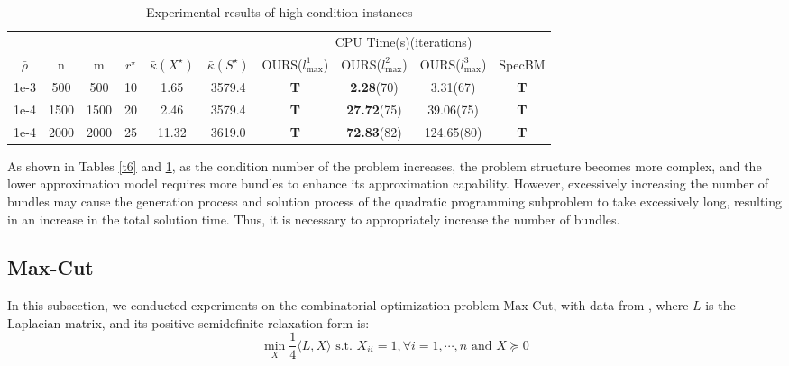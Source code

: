 \documentclass{jcmlatex}
\begin{document}
\begin{table}
    \centering
    \caption{Experimental results of high condition instances}
    \label{t7}
    \setlength\tabcolsep{0.9pt}
    \begin{tabular*}{\textwidth}{@{\extracolsep\fill}cccccccccc}
\toprule  
~&~&~&~&~&~& \multicolumn{4}{c}{CPU Time(s)(iterations)} \\
\cmidrule{7-10}
\(\bar{\rho}\) & n &m& \(r^{\star}\) &\(\bar{\kappa}(X^{\star})\)&\(\bar{\kappa}(S^{\star})\)& OURS(\(l_{\max}^{1}\)) & OURS(\(l_{\max}^{2}\))& OURS(\(l_{\max}^{3}\)) & SpecBM\\ 
\midrule 
    1e-3 & 500&500 &10&1.65 &3579.4 &\textbf{T} &\textbf{2.28}(70)&3.31(67) &\textbf{T} \\
    1e-4 & 1500&1500 &20&2.46 &3579.4 &\textbf{T} &\textbf{27.72}(75)&39.06(75) &\textbf{T} \\
    1e-4 & 2000&2000 &25&11.32 &3619.0 &\textbf{T} &\textbf{72.83}(82)&124.65(80) &\textbf{T} \\
\hline
\end{tabular*}
\end{table}

As shown in Tables \ref{t6} and \ref{t7}, as the condition number of the problem increases, the problem structure becomes more complex, and the lower approximation model requires more bundles to enhance its approximation capability. However, excessively increasing the number of bundles may cause the generation process and solution process of the quadratic programming subproblem to take excessively long, resulting in an increase in the total solution time. Thus, it is necessary to appropriately increase the number of bundles.
\subsection{Max-Cut}
In this subsection, we conducted experiments on the combinatorial optimization problem Max-Cut, with data from \cite{davis2011university}, where \(L\) is the Laplacian matrix, and its positive semidefinite relaxation form is:
\begin{equation*}
\underset{X}{\min} \frac{1}{4}\langle L,X \rangle \text{ s.t. }X_{ii}=1,\forall i=1,\cdots,n\text{ and }X\succeq 0
\end{equation*}
\end{document}

